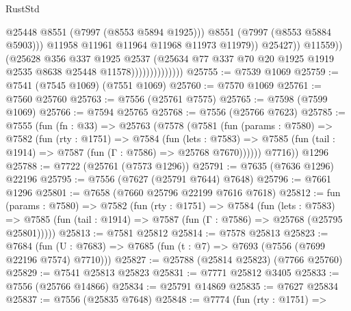 \begin{lexlean}{RustStd}
\begin{coremodule}
{\begin{coremodule}
{{{{{{{{{{{{{{{{{{{{{{{{{{{{{{{{{{{{{{{{{{{                                            @25448
                                            @8551
                                            (@7997 (@8553 @5894 @1925)))
                                          @8551
                                          (@7997 (@8553 @5884 @5903)))
                                        @11958
                                        @11961
                                        @11964
                                        @11968
                                        @11973
                                        @11979))
                                    @25427))
                                @11559))
                            (@25628
                              @356
                              @337
                              @1925
                              @2537
                              (@25634
                                @77
                                @337
                                @70
                                @20
                                @1925
                                @1919
                                @2535
                                @8638
                                @25448
                                @11578))))))))))))))
@25755 := @7539 @1069
@25759 := @7541 (@7545 @1069) (@7551 @1069)
@25760 := @7570 @1069
@25761 := @7560 @25760
@25763 := @7556 (@25761 @7575)
@25765 := @7598 (@7599 @1069)
@25766 := @7594 @25765
@25768 := @7556 (@25766 @7623)
@25785 := @7555
    (fun (fn : @33) =>
    @25763
      (@7578
        (@7581
          (fun (params : @7580) =>
          @7582
            (fun (rty : @1751) =>
            @7584
              (fun (lets : @7583) =>
              @7585 (fun (tail : @1914) => @7587 (fun (Γ : @7586) => @25768 @7670))))))
        @7716))
    @1296
@25788 := @7722 (@25761 (@7573 @1296))
@25791 := @7635 (@7636 @1296) @22196
@25795 := @7556 (@7627 (@25791 @7644) @7648)
@25796 := @7661 @1296
@25801 := @7658 (@7660 @25796 @22199 @7616 @7618)
@25812 := fun (params : @7580) =>
  @7582
    (fun (rty : @1751) =>
    @7584
      (fun (lets : @7583) =>
      @7585 (fun (tail : @1914) => @7587 (fun (Γ : @7586) => @25768 (@25795 @25801)))))
@25813 := @7581 @25812
@25814 := @7578 @25813
@25823 := @7684
    (fun (U : @7683) => @7685 (fun (t : @7) => @7693 (@7556 (@7699 @22196 @7574) @7710)))
@25827 := @25788 (@25814 @25823) (@7766 @25760)
@25829 := @7541 @25813 @25823
@25831 := @7771 @25812 @3405
@25833 := @7556 (@25766 @14866)
@25834 := @25791 @14869
@25835 := @7627 @25834
@25837 := @7556 (@25835 @7648)
@25848 := @7774
    (fun (rty : @1751) =>
}}}}}}}}}}}}}}}}}}}}}}}}}}}}}}}}}}}}}}}}}}}
\end{coremodule}}
\end{coremodule}
\end{lexlean}
